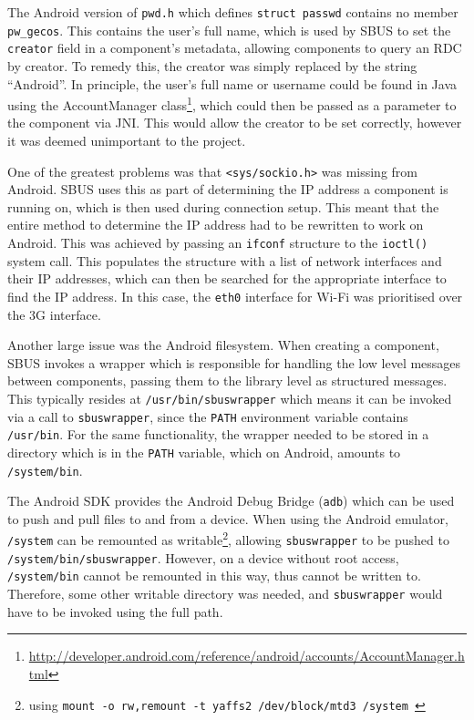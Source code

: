 \documentclass[12pt,twoside,notitlepage]{report}
\begin{document}
The Android version of {\tt pwd.h} which defines {\tt struct passwd} contains no member {\tt pw\_gecos}. 
This contains the user's full name, which is used by SBUS to set the {\tt creator} field in a component's metadata, allowing components to query an RDC by creator. 
To remedy this, the creator was simply replaced by the string ``Android''. 
In principle, the user's full name or username could be found in Java using the AccountManager class\footnote{\url{http://developer.android.com/reference/android/accounts/AccountManager.html}}, which could then be passed as a parameter to the component via JNI. 
This would allow the creator to be set correctly, however it was deemed unimportant to the project. 

One of the greatest problems was that {\tt <sys/sockio.h>} was missing from Android.
SBUS uses this as part of determining the IP address a component is running on, which is then used during connection setup. 
This meant that the entire method to determine the IP address had to be rewritten to work on Android. 
This was achieved by passing an {\tt ifconf} structure to the {\tt ioctl()} system call.
This populates the structure with a list of network interfaces and their IP addresses, which can then be searched for the appropriate interface to find the IP address. 
In this case, the {\tt eth0} interface for Wi-Fi was prioritised over the 3G interface.

Another large issue was the Android filesystem. 
When creating a component, SBUS invokes a wrapper which is responsible for handling the low level messages between components, passing them to the library level as structured messages.
This typically resides at {\tt /usr/bin/sbuswrapper} which means it can be invoked via a call to {\tt sbuswrapper}, since the {\tt PATH} environment variable contains {\tt /usr/bin}. 
For the same functionality, the wrapper needed to be stored in a directory which is in the {\tt PATH} variable, which on Android, amounts to {\tt /system/bin}. 

The Android SDK provides the Android Debug Bridge ({\tt adb}) which can be used to push and pull files to and from a device. 
When using the Android emulator, {\tt /system} can be remounted as writable\footnote{using {\tt mount -o rw,remount -t yaffs2 /dev/block/mtd3 /system }}, allowing {\tt sbuswrapper} to be pushed to {\tt /system/bin/sbuswrapper}. 
However, on a device without root access, {\tt /system/bin} cannot be remounted in this way, thus cannot be written to. 
Therefore, some other writable directory was needed, and {\tt sbuswrapper} would have to be invoked using the full path. 
\end{document}

